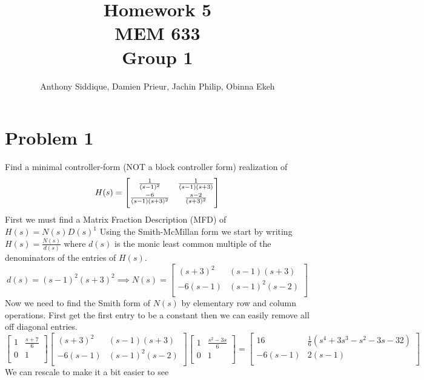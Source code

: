 \documentclass{article}
\author{Anthony Siddique, Damien Prieur, Jachin Philip, Obinna Ekeh}
\title{Homework 5\\ MEM 633 \\ Group 1}
\date{}
\begin{document}
\maketitle

\section*{Problem 1}
Find a minimal controller-form (NOT a block controller form) realization of
\[
H(s) =
\setlength{\delimitershortfall}{0pt}
\begin{bmatrix}
\frac{1}{(s-1)^2} & \frac{1}{(s-1)(s+3)} \\[0.5em]
\frac{-6}{(s-1)(s+3)^2} & \frac{s-2}{(s+3)^2} \\[0.5em]
\end{bmatrix}
\]
\newline
\newline
First we must find a Matrix Fraction Description (MFD) of \(H(s) = N(s)D(s)^{1}\)
Using the Smith-McMillan form we start by writing \(H(s) = \frac{N(s)}{d(s)}\) where \(d(s)\) is the monic least common multiple of the denominators of the entries of \(H(s)\).
\[
d(s) = (s-1)^2(s+3)^2 \implies
N(s) =
\begin{bmatrix}
(s+3)^2 & (s-1)(s+3) \\
-6(s-1) & (s-1)^2(s-2) \\
\end{bmatrix}
\]
Now we need to find the Smith form of \(N(s)\) by elementary row and column operations.
First get the first entry to be a constant then we can easily remove all off diagonal entries.
\[
\begin{bmatrix}
1 & \frac{s+7}{6} \\
0 & 1 \\
\end{bmatrix}
\begin{bmatrix}
(s+3)^2 & (s-1)(s+3) \\
-6(s-1) & (s-1)^2(s-2) \\
\end{bmatrix}
\begin{bmatrix}
1 & \frac{s^2-3s}{6}\\
0 & 1 \\
\end{bmatrix}
=
\begin{bmatrix}
16 & \frac{1}{6}(s^4 + 3s^3 -s^2 -3s - 32) \\
-6(s-1) & 2(s-1) \\
\end{bmatrix}
\]
We can rescale to make it a bit easier to see
\end{document}
